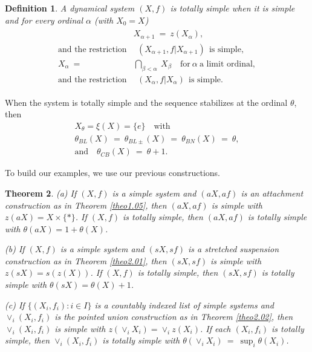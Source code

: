 \documentclass[12pt]{amsart}
\newtheorem{theo}{{\bfseries Theorem}}[section]
\newtheorem{df}[theo]{{\bfseries Definition}}
\def \a {\alpha }
\def \b {\beta}
\def \th {\theta}
\numberwithin{equation}{section}
\begin{document}
\begin{df}\label{df3.03} A dynamical system $(X,f)$ is \emph{totally simple} when it is simple and for every ordinal $\a$
(with $X_0 = X$)
\begin{align}\label{eq3.04}\begin{split}
&X_{\a + 1} \ = \ z(X_{\a}),\\
\text{and the restriction} & \ \ (X_{\a + 1},f|X_{\a + 1}) \ \ \text{is simple}, \\
X_{\a} \ = \ & \bigcap_{\b < \a} \ X_{\b} \quad \text{for} \ \a \ \text{a limit ordinal},\\
\text{and the restriction} &  \ \ (X_{\a},f|X_{\a}) \ \ \text{is simple}.
\end{split}\end{align}\end{df}\vspace{.25cm}

When the system is totally simple and the sequence stabilizes at the ordinal $\th$, then
\begin{equation}\label{eq3.05}\begin{split}
X_{\th} = \xi(X) = \{ e \} \quad \text{with} \hspace{3cm} \\ \th_{BL}(X)\ = \ \th_{BL\pm}(X)\ = \ \th_{BN}(X) \ = \ \th, \\
\text{and} \quad \th_{CB}(X) \ = \ \th + 1. \hspace{2cm}
\end{split}\end{equation}

To build our examples, we use  our previous constructions.

\begin{theo}\label{theo3.04}(a) If $(X,f)$ is a simple system and $(aX, af)$ is an attachment construction as in Theorem \ref{theo1.05},
then $(aX, af)$ is simple with $z(aX) =  X \times \{ * \}$. If $(X,f)$ is totally simple, then $(aX, af)$ is totally simple
with $\th(aX) = 1 + \th(X)$.

(b) If $(X,f)$ is a simple system and $(sX, sf)$ is a stretched suspension construction as in Theorem \ref{theo2.01},
then $(sX, sf)$ is simple with $z(sX) = s(z(X))$. If $(X,f)$ is totally simple, then $(sX, sf)$ is totally simple
with $\th(sX) = \th(X) + 1$.

(c) If $\{ (X_i,f_i) : i \in I \}$ is a countably indexed list of simple systems and $\vee_i (X_i, f_i)$ is the pointed
union construction   as in Theorem \ref{theo2.02}, then $\vee_i (X_i, f_i)$ is simple with $z(\vee_i X_i) = \vee_i z(X_i)$.
If each $(X_i,f_i)$ is totally simple, then $\vee_i (X_i, f_i)$ is totally simple  with
$\th(\vee_i X_i) \ = \ \sup_i \th(X_i)$.
\end{theo}
\end{document}
